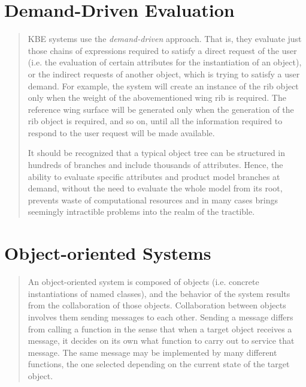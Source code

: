 \documentclass [11pt]{book}
\begin{document}
\section{Demand-Driven Evaluation}

\label{sec:demand-drivenevaluation}



\begin{quote}
KBE systems use the \emph{demand-driven} approach. That is, they evaluate just those chains of
expressions required to satisfy a direct request of the user (i.e. the
evaluation of certain attributes for the instantiation of an object),
or the indirect requests of another object, which is trying to satisfy
a user demand. For example, the system will create an instance of the
rib object only when the weight of the abovementioned wing rib is
required. The reference wing surface will be generated only when the
generation of the rib object is required, and so on, until all the
information required to respond to the user request will be made
available.

It should be recognized that a typical object tree can be structured
in hundreds of branches and include thousands of attributes. Hence,
the ability to evaluate specific attributes and product model branches
at demand, without the need to evaluate the whole model from its root,
prevents waste of computational resources and in many cases brings
seemingly intractible problems into the realm of the tractible.

\end{quote}


\section{Object-oriented Systems}

\label{sec:object-orientedsystems}



\begin{quote}
An object-oriented system is composed of
       objects (i.e. concrete instantiations of named classes), and
       the behavior of the system results from the collaboration of
       those objects. Collaboration between objects involves them
       sending messages to each other. Sending a message differs from
       calling a function in the sense that when a target object
       receives a message, it decides on its own what function to
       carry out to service that message. The same message may be
       implemented by many different functions, the one selected
       depending on the current state of the target object.

\end{quote}
\end{document}
